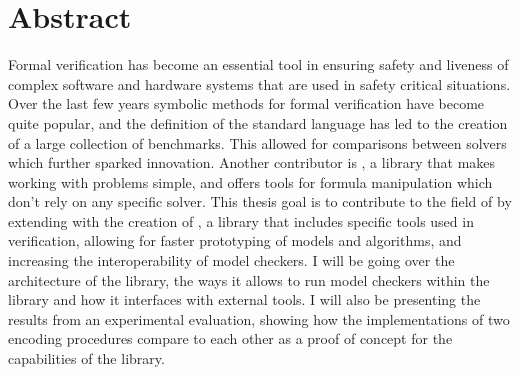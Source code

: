 \chapter*{Abstract}
\label{abstract}


Formal verification has become an essential tool in ensuring safety and liveness of complex software and hardware systems that are used in safety critical situations.
Over the last few years symbolic methods for formal verification have become quite popular, and the definition of the standard language \smtlib{} has led to the creation of a large collection of benchmarks.
This allowed for comparisons between \smt{} solvers which further sparked innovation.
Another contributor is \pysmt{}, a \python{} library that makes working with \smt{} problems simple, and offers tools for formula manipulation which don't rely on any specific solver.
This thesis goal is to contribute to the field of \VMT{} by extending \pysmt{} with the creation of \pyvmt{}, a library that includes specific tools used in verification, allowing for faster prototyping of models and algorithms, and increasing the interoperability of model checkers.
I will be going over the architecture of the library, the ways it allows to run model checkers within the library and how it interfaces with external tools.
I will also be presenting the results from an experimental evaluation, showing how the implementations of two \ltl{} encoding procedures compare to each other as a proof of concept for the capabilities of the library.

